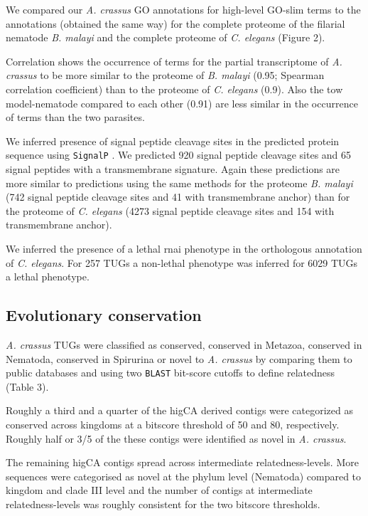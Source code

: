 \documentclass[10pt]{bmc_article}
\newenvironment{bmcformat}{\begin{raggedright}\baselineskip20pt\sloppy\setboolean{publ}{false}}{\end{raggedright}\baselineskip20pt\sloppy}
\begin{document}
\begin{bmcformat}
We compared our \textit{A. crassus} GO annotations for high-level
GO-slim terms to the annotations (obtained the same way) for the
complete proteome of the filarial nematode \textit{B. malayi} and the
complete proteome of \textit{C. elegans} (Figure 2).

Correlation shows the occurrence of terms for the partial
transcriptome of \textit{A. crassus} to be more similar to the
proteome of \textit{B. malayi} (0.95;
Spearman correlation coefficient) than to the proteome of
\textit{C. elegans} (0.9). Also the tow
model-nematode compared to each other (0.91)
are less similar in the occurrence of terms than the two parasites.

We inferred presence of signal peptide cleavage sites in the predicted
protein sequence using \texttt{SignalP} \cite{pmid21959131}. We predicted
920 signal peptide cleavage sites and 65 signal
peptides with a transmembrane signature. Again these predictions are
more similar to predictions using the same methods for the proteome
\textit{B. malayi} (742 signal peptide cleavage sites and
41 with transmembrane anchor) than for the proteome of
\textit{C. elegans} (4273 signal peptide cleavage sites
and 154 with transmembrane anchor).

We inferred the presence of a lethal rnai phenotype in the orthologous
annotation of \textit{C. elegans}. For 257
TUGs a non-lethal phenotype was inferred for
6029 TUGs a lethal phenotype.

\subsection*{Evolutionary conservation}

\textit{A. crassus} TUGs were classified as conserved, conserved in
Metazoa, conserved in Nematoda, conserved in Spirurina or novel to
\textit{A. crassus} by comparing them to public databases and using
two \texttt{BLAST} bit-score cutoffs to define relatedness (Table 3).

Roughly a third and a quarter of the higCA derived contigs were
categorized as conserved across kingdoms at a bitscore threshold of 50
and 80, respectively. Roughly half or 3/5 of the these contigs were
identified as novel in \textit{A. crassus}.

The remaining higCA contigs spread across intermediate
relatedness-levels. More sequences were categorised as novel at the
phylum level (Nematoda) compared to kingdom and clade III level and the
number of contigs at intermediate relatedness-levels was roughly
consistent for the two bitscore thresholds.


\end{bmcformat}
\end{document}
